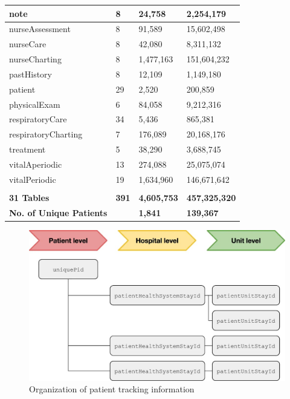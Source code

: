 \begin{table}[!htbp]
{\begin{tabular}{@{}llll@{}}
note                        & 8     & 24,758    & 2,254,179     \\ \midrule
nurseAssessment             & 8     & 91,589    & 15,602,498    \\ \midrule
nurseCare                   & 8     & 42,080    & 8,311,132     \\ \midrule
nurseCharting               & 8     & 1,477,163 & 151,604,232   \\ \midrule
pastHistory                 & 8     & 12,109    & 1,149,180     \\ \midrule
patient                     & 29    & 2,520     & 200,859       \\ \midrule
physicalExam                & 6     & 84,058    & 9,212,316     \\ \midrule
respiratoryCare             & 34    & 5,436     & 865,381       \\ \midrule
respiratoryCharting         & 7     & 176,089   & 20,168,176    \\ \midrule
treatment                   & 5     & 38,290    & 3,688,745     \\ \midrule
vitalAperiodic              & 13    & 274,088   & 25,075,074    \\ \midrule
vitalPeriodic               & 19    & 1,634,960 & 146,671,642   \\ \midrule
                                                                \\
\textbf{31 Tables} & \textbf{391}  & \textbf{4,605,753} & \textbf{457,325,320} \\ \midrule
\textbf{No. of Unique Patients} &  & \textbf{1,841}     & \textbf{139,367} \\
\bottomrule
\end{tabular}}
\end{table}

\begin{figure}[ht]
\centering
\includegraphics[width=14cm]{fig/chapter3/Organization of patient tracking information.jpg}
\caption{Organization of patient tracking information \cite{pollard_eicu_2018}}
\label{fig:eicuidentifiers}
\end{figure}

